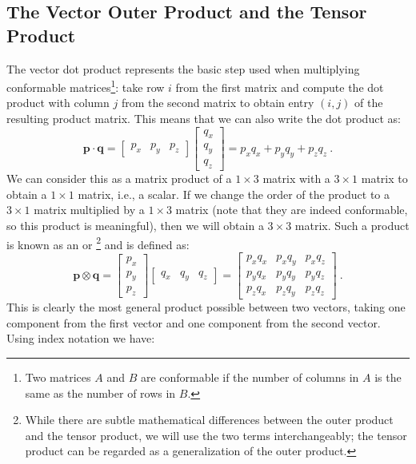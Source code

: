 \subsection{The Vector Outer Product and the Tensor Product}\label{\chabbr:ssec:tensorproduct}
The vector dot product represents the basic step used when multiplying conformable matrices\footnote{Two matrices $A$ and $B$ are conformable if the number of columns in $A$ is the same as the number of rows in $B$.}: take row $i$ from the first matrix and compute the dot product with column $j$ from the second matrix to obtain entry $(i,j)$ of the resulting product matrix. This means that we can also write the dot product as:
\begin{equation}
	\mathbf{p}\cdot\mathbf{q} = \begin{bmatrix}p_x & p_y& p_z\end{bmatrix}\begin{bmatrix}q_x\\ q_y\\ q_z\end{bmatrix} = p_xq_x+p_yq_y+p_zq_z\ .
\end{equation}
We can consider this as a matrix product of a $1\times 3$ matrix with a $3\times 1$ matrix to obtain a $1\times 1$ matrix, i.e., a scalar. If we change the order of the product to a $3\times 1$ matrix multiplied by a $1\times 3$ matrix (note that they are indeed conformable, so this product is meaningful), then we will obtain a $3\times 3$ matrix.  Such a product is known as an  or \footnote{While there are subtle mathematical differences between the outer product and the tensor product, we will use the two terms interchangeably; the tensor product can be regarded as a generalization of the outer product.} and is defined as:
\begin{equation}
	\mathbf{p}\otimes\mathbf{q} = \begin{bmatrix}p_x\\ p_y\\ p_z\end{bmatrix}\begin{bmatrix}q_x& q_y& q_z\end{bmatrix}= \begin{bmatrix}p_xq_x&p_xq_y&p_xq_z\\ p_yq_x&p_yq_y&p_yq_z\\ p_zq_x&p_zq_y&p_zq_z\end{bmatrix}\ .
\end{equation}
This is clearly the most general product possible between two vectors, taking one component from the first vector and one component from the second vector.  Using index notation we have:
